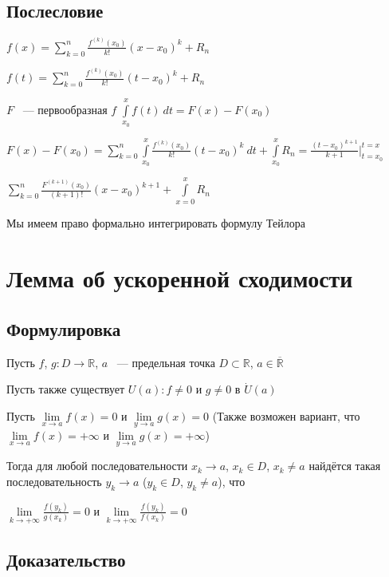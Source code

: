 \documentclass{article}
\begin{document}
		\subsection{Послесловие}

			$f(x) = \sum\limits^n_{k = 0} \frac{f^{(k)}(x_0)}{k!} (x - x_0)^k + R_n$

			$f(t) = \sum\limits^n_{k = 0} \frac{f^{(k)}(x_0)}{k!} (t - x_0)^k + R_n$

			$F$ ~--- первообразная $f$  $\int\limits^x_{x_0} f(t) \ dt = F(x) - F(x_0)$

			$F(x) - F(x_0) = \sum\limits^n_{k = 0} \int\limits^x_{x_0} \frac{f^{(k)} (x_0)}{k!} (t - x_0)^k \ dt + \int\limits^x_{x_0} R_n = \frac{(t - x_0)^{k + 1}}{k + 1} \bigg|^{t = x}_{t = x_0}$

			$\sum\limits^n_{k = 0} \frac{F^{(k + 1)} (x_0)}{(k + 1)!} (x - x_0)^{k + 1} + \int\limits^x_{x = 0} R_n$

			Мы имеем право формально интегрировать формулу Тейлора

	\newpage

	\section{Лемма об ускоренной сходимости}
	
		\subsection{Формулировка}
		
			Пусть $f$, $g : D \rightarrow \mathbb{R}$, $a$ ~--- предельная точка $D \subset \mathbb{R}$, $a \in \overline{\mathbb{R}}$
		
			Пусть также существует $U(a) : f \neq 0$ и $g \neq 0$ в $\dot{U}(a)$
		
			Пусть $\lim\limits_{x \rightarrow a} f(x) = 0$ и $\lim\limits_{y \rightarrow a} g(x) = 0$ (Также возможен вариант, что $\lim\limits_{x \rightarrow a} f(x) = + \infty$ и $\lim\limits_{y \rightarrow a} g(x) = +\infty$)
			
			Тогда для любой последовательности $x_k \rightarrow a$, $x_k \in D$, $x_k \neq a$ найдётся такая последовательность $y_k \rightarrow a$ ($y_k \in D$, $y_k \neq a$), что 
			
			$\lim\limits_{k \rightarrow +\infty} \frac{f(y_k)}{g(x_k)} = 0$ и $\lim\limits_{k \rightarrow +\infty} \frac{f(y_k)}{f(x_k)} = 0$
			
		\subsection{Доказательство}
		
\end{document}
